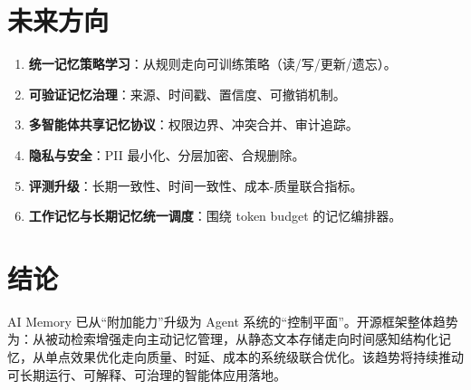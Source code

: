 \documentclass[12pt,a4paper]{article}
\begin{document}
\section{未来方向}
\begin{enumerate}[leftmargin=2em]
  \item \textbf{统一记忆策略学习}：从规则走向可训练策略（读/写/更新/遗忘）。
  \item \textbf{可验证记忆治理}：来源、时间戳、置信度、可撤销机制。
  \item \textbf{多智能体共享记忆协议}：权限边界、冲突合并、审计追踪。
  \item \textbf{隐私与安全}：PII 最小化、分层加密、合规删除。
  \item \textbf{评测升级}：长期一致性、时间一致性、成本-质量联合指标。
  \item \textbf{工作记忆与长期记忆统一调度}：围绕 token budget 的记忆编排器。
\end{enumerate}

\section{结论}
AI Memory 已从“附加能力”升级为 Agent 系统的“控制平面”。开源框架整体趋势为：从被动检索增强走向主动记忆管理，从静态文本存储走向时间感知结构化记忆，从单点效果优化走向质量、时延、成本的系统级联合优化。该趋势将持续推动可长期运行、可解释、可治理的智能体应用落地。



\end{document}
